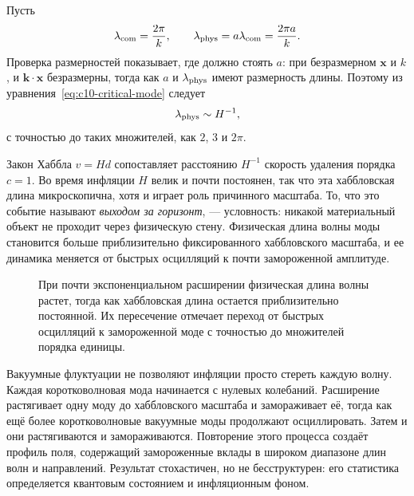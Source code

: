 Пусть
\[
\lambda_{\rm com}=\frac{2\pi}{k},
\qquad
\lambda_{\rm phys}=a\lambda_{\rm com}
=\frac{2\pi a}{k}.
\]
Проверка размерностей показывает, где должно стоять \(a\): при безразмерном \(\mathbf x\) и \(k\), и \(\mathbf k\cdot\mathbf x\) безразмерны, тогда как \(a\) и \(\lambda_{\rm phys}\) имеют размерность длины. Поэтому из уравнения~\eqref{eq:c10-critical-mode} следует
\begin{equation}
\lambda_{\rm phys}\sim H^{-1},
\label{eq:c10-horizon-crossing}
\end{equation}
с точностью до таких множителей, как \(2\), \(3\) и \(2\pi\).

Закон Хаббла \(v=Hd\) сопоставляет расстоянию \(H^{-1}\) скорость удаления порядка \(c=1\). Во время инфляции \(H\) велик и почти постоянен, так что эта хаббловская длина микроскопична, хотя и играет роль причинного масштаба. То, что это событие называют \emph{выходом за горизонт}, — условность: никакой материальный объект не проходит через физическую стену. Физическая длина волны моды становится больше приблизительно фиксированного хаббловского масштаба, и ее динамика меняется от быстрых осцилляций к почти замороженной амплитуде.

\begin{figure}[htbp]
\centering
\begin{coursefitfigure}
\end{coursefitfigure}
\caption{При почти экспоненциальном расширении физическая длина волны растет, тогда как хаббловская длина остается приблизительно постоянной. Их пересечение отмечает переход от быстрых осцилляций к замороженной моде с точностью до множителей порядка единицы.}
\label{fig:c10-horizon-reconstruction}
\end{figure}

Вакуумные флуктуации не позволяют инфляции просто стереть каждую волну. Каждая коротковолновая мода начинается с нулевых колебаний. Расширение растягивает одну моду до хаббловского масштаба и замораживает её, тогда как ещё более коротковолновые вакуумные моды продолжают осциллировать. Затем и они растягиваются и замораживаются. Повторение этого процесса создаёт профиль поля, содержащий замороженные вклады в широком диапазоне длин волн и направлений. Результат стохастичен, но не бесструктурен: его статистика определяется квантовым состоянием и инфляционным фоном.

